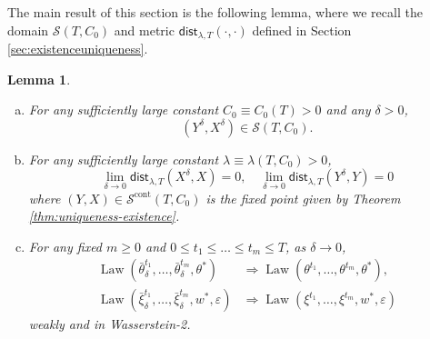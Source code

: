 \documentclass[11pt,letterpaper,reqno]{amsart}
\newtheorem{lem}[thm]{Lemma}
\theoremstyle{definition}
\def\eps{\varepsilon}
\def\Law{\operatorname{Law}}
\def\cS{\mathcal{S}}
\newcommand{\lbddst}[2]{\mathsf{dist}_{\lambda,T}(#1,#2)}
\begin{document}
The main result of this section is the following lemma, where we recall
the domain $\cS(T,C_0)$ and metric $\lbddst{\cdot}{\cdot}$ defined in Section
\ref{sec:existenceuniqueness}.

\begin{lem}\label{lem:dmft_discretization_error}
\begin{enumerate}[(a)]
\item For any sufficiently large constant $C_0 \equiv C_0(T)>0$ and any
$\delta>0$,
\[(Y^\delta,X^\delta) \in \cS(T,C_0).\]
\item For any sufficiently large constant $\lambda \equiv \lambda(T,C_0)>0$,
\[\lim_{\delta \to 0} \lbddst{X^\delta}{X}=0,
\quad \lim_{\delta \to 0} \lbddst{Y^\delta}{Y}=0\]
where $(Y,X) \in \cS^\text{cont}(T,C_0)$ is the fixed point given by Theorem
\ref{thm:uniqueness-existence}.
\item For any fixed $m \geq 0$ and $0 \leq t_1 \leq \ldots \leq t_m \leq T$,
as $\delta \to 0$,
\begin{align}
\Law(\bar \theta^{t_1}_\delta,\ldots,\bar \theta^{t_m}_\delta,\theta^*)
&\Rightarrow
\Law(\theta^{t_1},\ldots,\theta^{t_m},\theta^*),\,\label{eq:discretedmftthetaconv}\\
\Law(\bar \xi_\delta^{t_1},\ldots,\bar \xi_\delta^{t_m},w^*,\eps) &\Rightarrow
\Law(\xi^{t_1},\ldots,\xi^{t_m},w^*,\eps)\label{eq:discretedmftetaconv}
\end{align}
weakly and in Wasserstein-2.
\end{enumerate}
\end{lem}
\end{document}
